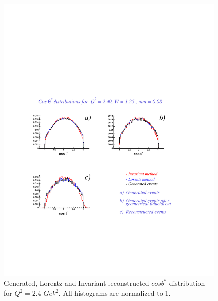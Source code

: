 \begin{figure}[h]
    \begin{center}
        \includegraphics[width = 12cm, bb = 60 140 540 540]{appendix/img/ctheta_q22.40_W1.25_mm0.08}
        \caption{Generated, Lorentz and Invariant reconstructed $cos\theta^*$ distribution for $Q^2=2.4$ $GeV^2$.
        All histograms are normalized to 1.}
    \end{center}
\end{figure}
